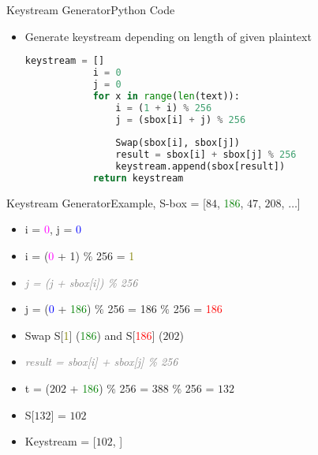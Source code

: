 \documentclass[
	aspectratio=169,	%
	onlytextwidth,		%
	t					%
	]{beamer}
\begin{document}
\begin{frame}[fragile]{Keystream Generator}{Python Code}
	\begin{itemize}
		\item Generate keystream depending on length of given plaintext
		\begin{lstlisting}[language=Python]
			keystream = []
			i = 0
			j = 0
			for x in range(len(text)):
				i = (1 + i) % 256
				j = (sbox[i] + j) % 256
				
				Swap(sbox[i], sbox[j])
				result = sbox[i] + sbox[j] % 256
				keystream.append(sbox[result])   
			return keystream   
		\end{lstlisting}
	\end{itemize}
\end{frame}

\begin{frame}[fragile]{Keystream Generator}{Example, S-box = [$84$, \textcolor{green}{186}, $47$, $208$, $\dots$]}
	\begin{itemize}[<+->]
		\item i = \textcolor{magenta}{0}, j = \textcolor{blue}{0}
		\item i = (\textcolor{magenta}{0} + 1) $\%$ 256 = \textcolor{olive}{1}
		\item \textit{\textcolor{gray}{j = (j + sbox[i]) \% 256}}
		\item j = (\textcolor{blue}{0} + \textcolor{green}{186}) $\%$ 256 = 186 $\%$ 256 = \textcolor{red}{186}
	\end{itemize}
	\medskip
	\begin{itemize}[<+->]
		\item Swap S[\textcolor{olive}{1}] (\textcolor{green}{186}) and S[\textcolor{red}{186}] ($202$)
		\item \textit{\textcolor{gray}{result = sbox[i] + sbox[j] \% 256}}
		\item t = ($202$ + \textcolor{green}{186}) $\%$ 256 = 388 $\%$ 256 = $132$
		\item S[$132$] = $102$
		\item Keystream = [$102$, ]
	\end{itemize}
\end{frame}
\end{document}
